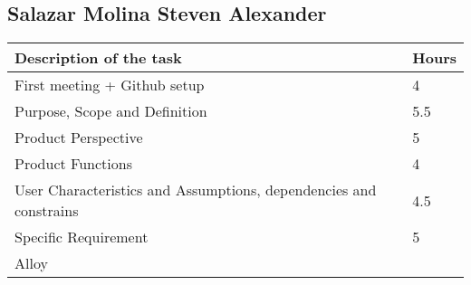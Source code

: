 \subsection{Salazar Molina Steven Alexander}
\begin{center}
\renewcommand{\arraystretch}{1.5}

\begin{tabular}{ |m{7cm}|m{2cm}| } 
 \hline
 \textbf{Description of the task}  & \textbf{Hours} \\
 \hline
 First meeting + Github setup & 4 \\
 \hline
 Purpose, Scope and Definition & 5.5 \\
 \hline
 Product Perspective & 5 \\ 
 \hline
 Product Functions & 4 \\ 
 \hline 
 User Characteristics and Assumptions, dependencies and constrains & 4.5 \\  
 \hline
 Specific Requirement & 5 \\
 \hline
 Alloy & \\
 \hline
\end{tabular}
\end{center}
